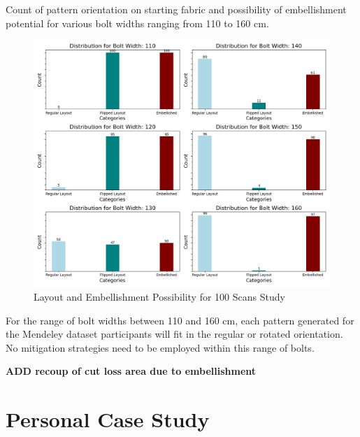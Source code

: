 Count of pattern orientation on starting fabric and possibility of embellishment potential for various bolt widths ranging from 110 to 160 cm.
\begin{figure} [H]
    \centering
    \includegraphics[width = \textwidth]{Images/Mendeley_Bar.png}
    \caption{Layout and Embellishment Possibility for 100 Scans Study}
\end{figure}
For the range of bolt widths between 110 and 160 cm, each pattern generated for the Mendeley dataset participants will fit in the regular or rotated orientation. No mitigation strategies need to be employed within this range of bolts.

\textbf{ADD recoup of cut loss area due to embellishment}

\section{Personal Case Study}
